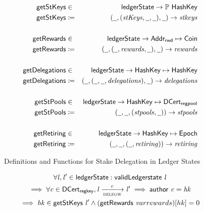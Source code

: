 \begin{figure}[ht]
  \centering
  \begin{align*}
    \fun{getStKeys} & \in & \ledgerState \to \powerset \HashKey \\
    \fun{getStKeys} & \coloneqq & (\wcard, (\var{stKeys}, \wcard, \wcard),
                                  \wcard) \to \var{stkeys} \\
                    &&\\
    \fun{getRewards} & \in & \ledgerState \to \AddrRWD \mapsto \Coin \\
    \fun{getRewards} & \coloneqq & (\wcard, (\wcard, \var{rewards}, \wcard),
                                   \wcard) \to \var{rewards} \\
                    &&\\
    \fun{getDelegations} & \in & \ledgerState \to \HashKey \mapsto \HashKey \\
    \fun{getDelegations} & \coloneqq & (\wcard, (\wcard, \wcard,
                                       \var{delegations}), \wcard) \to
                                       \var{delegations} \\
                    &&\\
    \fun{getStPools} & \in & \ledgerState \to \HashKey \mapsto \DCertRegPool \\
    \fun{getStPools} & \coloneqq & (\wcard, \wcard,
                                   (\var{stpools}, \wcard)) \to \var{stpools} \\
                    &&\\
    \fun{getRetiring} & \in & \ledgerState \to \HashKey \mapsto \Epoch \\
    \fun{getRetiring} & \coloneqq & (\wcard, \wcard,
                                    (\wcard, \var{retiring})) \to \var{retiring} \\
  \end{align*}
  \caption{Definitions and Functions for Stake Delegation in Ledger States}
  \label{fig:stake-delegation-functions}
\end{figure}


\begin{property}
  \begin{multline*}
    \forall \var{l}, \var{l'} \in \ledgerState: \applyFun{validLedgerstate}{l}\\
    \implies \forall \var{c} \in \DCertRegKey, \var{l} \trans{delegw}{c} \var{l'}
    \implies \applyFun{author}{c} = \var{hk}\\ \implies
    \var{hk} \in \applyFun{getStKeys}{l'} \wedge
    (\applyFun{getRewards}var{rewards})[hk] = 0
  \end{multline*}
  \label{prop:ledger-properties-6}
\end{property}

